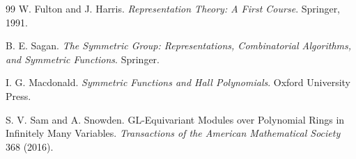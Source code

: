 \documentclass[11pt]{article}
\begin{document}
\begin{thebibliography}{99}
W. Fulton and J. Harris.
\newblock \emph{Representation Theory: A First Course}.
\newblock Springer, 1991.

B. E. Sagan.
\newblock \emph{The Symmetric Group: Representations, Combinatorial Algorithms, and Symmetric Functions}.
\newblock Springer.

I. G. Macdonald.
\newblock \emph{Symmetric Functions and Hall Polynomials}.
\newblock Oxford University Press.

S. V. Sam and A. Snowden.
\newblock GL-Equivariant Modules over Polynomial Rings in Infinitely Many Variables.
\newblock \emph{Transactions of the American Mathematical Society} 368 (2016).

\end{thebibliography}
\end{document}
